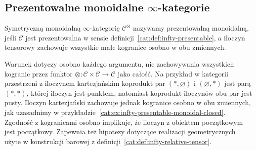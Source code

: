 \subsection{Prezentowalne monoidalne \texorpdfstring{$\infty$-kategorie}{kategorie wyższe}}

\begin{definicja}\label{cat:def:infty-presentable-monoidal}
Symetryczną monoidalną $\infty$-kategorię $\mathcal C^\otimes$ nazywamy prezentowalną monoidalną, jeśli $\mathcal C$ jest prezentowalna w sensie definicji~\ref{cat:def:infty-presentable}, a iloczyn tensorowy zachowuje wszystkie małe kogranice osobno w obu zmiennych.
\end{definicja}

Warunek dotyczy osobno każdego argumentu, nie zachowywania wszystkich kogranic przez funktor $\otimes:\mathcal C\times\mathcal C\to\mathcal C$ jako całość. Na przykład w kategorii przestrzeni z iloczynem kartezjańskim koprodukt par $(*,\varnothing)$ i $(\varnothing,*)$ jest parą $(*,*)$, której iloczyn jest punktem, natomiast koprodukt iloczynów obu par jest pusty. Iloczyn kartezjański zachowuje jednak kogranice osobno w obu zmiennych, jak uzasadnimy w przykładzie~\ref{cat:ex:infty-presentable-monoidal-closed}. Zgodność z kogranicami osobno implikuje, że iloczyn z obiektem początkowym jest początkowy. Zapewnia też hipotezy dotyczące realizacji geometrycznych użyte w konstrukcji barowej z definicji~\ref{cat:def:infty-relative-tensor}.

